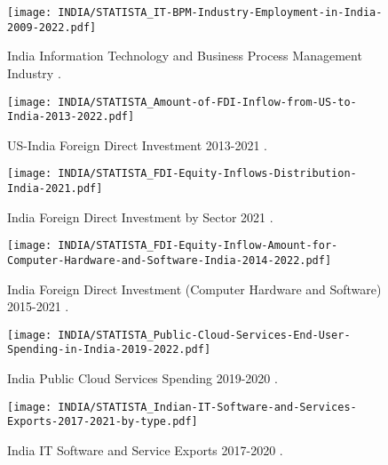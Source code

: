 \documentclass[a4paper, 12pt]{article}
\begin{document}
    \begin{figure}[ht]
       \centering
       \texttt{[image: INDIA/STATISTA\_IT-BPM-Industry-Employment-in-India-2009-2022.pdf]}
       \caption{India Information Technology and Business Process Management Industry \cite{INDIA_IT-BPM_INDUSTRY}.}
       \label{fig:IT-BPM_INDUSTRY_INDIA}
    \end{figure}
    \begin{figure}[ht]
       \centering
       \texttt{[image: INDIA/STATISTA\_Amount-of-FDI-Inflow-from-US-to-India-2013-2022.pdf]}
       \caption{US-India Foreign Direct Investment 2013-2021 \cite{INDIA_FDI_INFLOWS}.}
       \label{fig:FDI_US_INDIA}
    \end{figure}
    \begin{figure}[ht]
       \centering
       \texttt{[image: INDIA/STATISTA\_FDI-Equity-Inflows-Distribution-India-2021.pdf]}
       \caption{India Foreign Direct Investment by Sector 2021 \cite{INDIA_FDI_BY_SECTOR}.}
       \label{fig:FDI_SECTORS_INDIA}
    \end{figure}
    \begin{figure}[ht]
       \centering
       \texttt{[image: INDIA/STATISTA\_FDI-Equity-Inflow-Amount-for-Computer-Hardware-and-Software-India-2014-2022.pdf]}
       \caption{India Foreign Direct Investment (Computer Hardware and Software) 2015-2021 \cite{INDIA_FDI_HARDWARE_AND_SOFTWARE}.}
       \label{fig:FDI_HARDWARE_AND_SOFTWARE}
    \end{figure}
    \begin{figure}[ht]
       \centering
       \texttt{[image: INDIA/STATISTA\_Public-Cloud-Services-End-User-Spending-in-India-2019-2022.pdf]}
       \caption{India Public Cloud Services Spending 2019-2020 \cite{INDIA_PUBLIC_CLOUD_SPENDING}.}
       \label{fig:PUBLIC_CLOUD_SPENDING_INDIA}
    \end{figure}
    \begin{figure}[ht]
       \centering
       \texttt{[image: INDIA/STATISTA\_Indian-IT-Software-and-Services-Exports-2017-2021-by-type.pdf]}
       \caption{India IT Software and Service Exports 2017-2020 \cite{INDIA_EXPORT_IT}.}
       \label{fig:IT_EXPORTS_INDIA}
    \end{figure}



\end{document}
